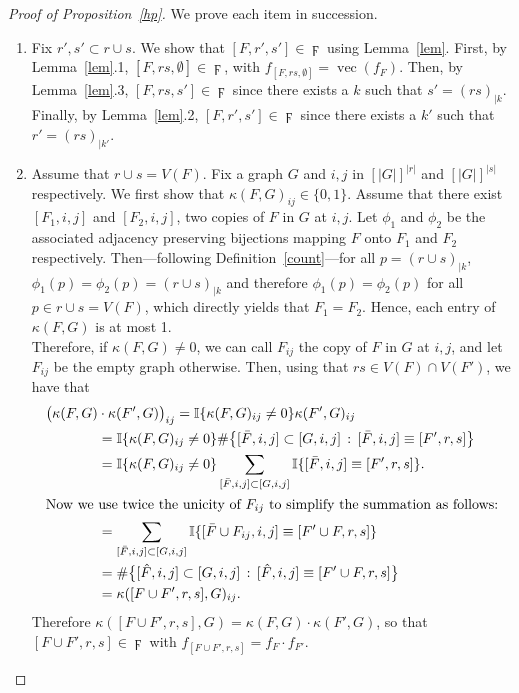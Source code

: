 \documentclass{article}
\theoremstyle{plain}
\DeclareMathOperator{\vect}{vec}
\begin{document}
\begin{proof}[Proof of Proposition~\protect\ref{hp}]
We prove each item in succession.
\vspace{-.3333\baselineskip}
\begin{enumerate}[leftmargin= *]
\item Fix $r',s'\subset r\cup s$. We show that $[F,r',s']\in\digamma$ using Lemma~\ref{lem}. First, by Lemma~\ref{lem}.1, $[F,rs,\emptyset]\in\digamma$, with $f_{[F,rs,\emptyset]}=\vect(f_F)$. Then, by Lemma~\ref{lem}.3, $[F,rs,s']\in\digamma$ since there exists a $k$ such that $s'=(rs)_{|k}$. Finally, by Lemma~\ref{lem}.2, $[F,r',s']\in\digamma$ since there exists a $k'$ such that $r'=(rs)_{|k'}$.
\item Assume that $r\cup s =V(F)$. Fix a graph $G$ and $i,j$ in $[|G|]^{|r|}$ and $[|G|]^{|s|}$ respectively. We first show that $\kappa(F,G)_{ij}\in\{0,1\}$. Assume that there exist $[F_1,i,j]$ and $[F_2,i,j]$, two copies of $F$ in $G$ at $i,j$. Let $\phi_1$ and $\phi_2$ be the associated adjacency preserving bijections mapping $F$ onto $F_1$ and $F_2$ respectively. Then---following Definition~\ref{count}---for all $p=(r\cup s)_{|k}$, $\phi_1(p)=\phi_2(p)=(r\cup s)_{|k}$ and therefore $\phi_1(p)=\phi_2(p)$ for all $p\in r\cup s=V(F)$, which directly yields that $F_1=F_2$. Hence, each entry of $\kappa(F,G)$ is at most 1.\\
Therefore, if $\kappa(F,G)\neq0$, we can call $F_{ij}$ the copy of $F$ in $G$ at $i,j$, and let $F_{ij}$ be the empty graph otherwise. Then, using that $rs\in V(F)\cap V(F')$, we have that
\begin{align*}
\big(\kappa(F,G)&\cdot\kappa(F',G)\big)_{ij}
=\mathbb{I}\{\kappa(F,G)_{ij}\neq0\}\kappa(F',G)_{ij}\\
&=\mathbb{I}\{\kappa(F,G)_{ij}\neq0\}
\#\big\{[\bar F,i,j]\subset [G,i,j]\,:\,[\bar F,i,j]\equiv [F',r,s]\big\}\\
&=\mathbb{I}\{\kappa(F,G)_{ij}\neq0\}\sum_{[\bar F,i,j]\subset [G,i,j]}\mathbb{I}\{[\bar F,i,j]\equiv [F',r,s]\}.\\
\intertext{Now we use twice the unicity of $F_{ij}$ to simplify the summation as follows:}
&=\sum_{[\bar F,i,j]\subset [G,i,j]}\mathbb{I}\{[\bar F\cup F_{ij},i,j]\equiv [F'\cup F,r,s]\}\\
&=\#\big\{[\hat F,i,j]\subset [G,i,j]\,:\,[\hat F,i,j]\equiv [F'\cup F,r,s]\big\}\\
&=\kappa([F\cup F',r,s],G)_{ij}.
\end{align*}
Therefore $\kappa([F\cup F',r,s],G) = \kappa(F,G)\cdot\kappa(F',G)$, so that $[F\cup F',r,s]\in\digamma$ with $f_{[F\cup F',r,s]} = f_{F}\cdot f_{F'}$.

\end{enumerate}
\end{proof}
\end{document}
